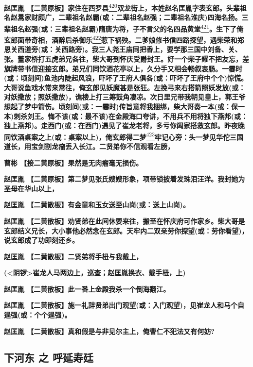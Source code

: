 \textbf{赵匡胤
【二黄原板】家住在西罗县}\protect\hyperlink{fn420}{\textsuperscript{420}}\textbf{双龙街上，本姓赵名匡胤字表玄郎。头辈祖名赵暠家财颇广，二辈祖名赵霸(或：二辈祖名赵强；二辈祖名淮庆)四海名扬。三辈祖名赵强(或：三辈祖名赵霸)隋唐为将，子不言父的名四品黄堂}\protect\hyperlink{fn421}{\textsuperscript{421}}\textbf{。生下了俺玄郎面带奇相，酒醉后杀御乐}\protect\hyperlink{fn422}{\textsuperscript{422}}\textbf{惹下祸殃。二爹娘修书信四路探望，遇柴荣和郑恩关西道旁(或：关西路旁)。我三人尧王庙同把香上，要学那三国中刘备、关、张。董家桥打五虎弟兄各往，柴大哥到怀庆受爵封王。好一个柴子耀不把友忘，差旗牌带书信迎接玄郎。弟兄们同饮酒花亭以上，久分手又相会畅叙衷肠。一霎时(或：顷刻间)鱼池内陡起风浪，吓坏了王府人俱各(或：吓坏了王府中个个)惊慌。大哥说鱼戏水常来常往，俺玄郎见妖魔甚是张狂。左挽弓来右搭箭照妖发放(或：对妖撒放；照妖撒放)，谯楼上打三筹鼓角凄凉。次日里兄带我朝见皇上，郭王爷想起了梦中箭伤。顷刻间(或：一霎时)传旨意将我捆绑，柴大哥奏一本(或：保一本)刺杀刘王。悔不该(或：最不该)在金殿海口夸讲，不用兵不用将独下燕邦(或：独上燕邦)。走西门(或：在西门)遇见了崔龙老将，多亏你阖家搭救玄郎。昨夜晚同饮酒桌案之上(或：桌案以上)，俺玄郎得二梦}\protect\hyperlink{fn423}{\textsuperscript{423}}\textbf{牢记心旁：头一梦见华佗三国道长，用宝剑割龙瘤丢入长江。二贤弟你不信观看左膀，}

\textbf{曹彬 【接二黄原板】果然是无肉瘤毫无损伤。}

\textbf{赵匡胤
【二黄原板】第二梦见张氏嫂嫂形象，项带锁披着发珠泪汪洋。我封她为圣母在华山以上，}

\textbf{赵匡胤 【二黄散板】有金童和玉女送至山岗(或：送上山岗)。}

\textbf{赵匡胤
【二黄散板】劝贤弟在此间休要来往，搬至在怀庆府可作家乡。柴大哥是玄郎结义兄长，大小事他必然念在玄郎。天牢内二双亲劳你探望(或：劳你看望)，说玄郎成了功即刻还乡。}

\textbf{赵匡胤 【二黄散板】二贤弟将手杻与我戴上，}

\textbf{(\textless{}阴锣\textgreater{}崔龙人马两边上，巡查；赵匡胤换衣、戴手杻，上)}

\textbf{赵匡胤 【二黄散板】此一番上金殿我杀一个倒海翻江。}

\textbf{赵匡胤
【二黄散板】施一礼辞贤弟出门观望(或：入门观望)，见崔龙人和马个自逞强(或：个个逞强)。}

\textbf{赵匡胤 【二黄散板】真和假是与非见尔主上，俺曹仁不犯法又有何妨?}

\newpage
\hypertarget{ux4e0bux6cb3ux4e1c-ux4e4b-ux547cux5ef6ux5bffux5ef7}{%
\subsection{下河东 之
呼延寿廷}\label{ux4e0bux6cb3ux4e1c-ux4e4b-ux547cux5ef6ux5bffux5ef7}}

